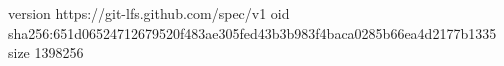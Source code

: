 version https://git-lfs.github.com/spec/v1
oid sha256:651d06524712679520f483ae305fed43b3b983f4baca0285b66ea4d2177b1335
size 1398256
